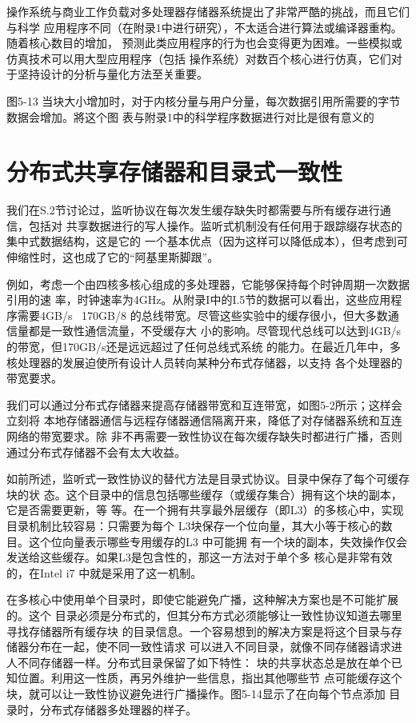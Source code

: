 操作系统与商业工作负载对多处理器存储器系统提出了非常严酷的挑战，而且它们与科学
应用程序不同（在附录1中进行研究），不太适合进行算法或编译器重构。随着核心数目的增加，
预测此类应用程序的行为也会变得更为困难。一些模拟或仿真技术可以用大型应用程序（包括
操作系统）对数百个核心进行仿真，它们对于坚持设计的分析与量化方法至关重要。

图5-13 当块大小增加时，对于内核分量与用户分量，每次数据引用所需要的字节数据会增加。將这个图
表与附录1中的科学程序数据进行对比是很有意义的

\section{分布式共享存储器和目录式一致性}
我们在S.2节讨论过，监听协议在每次发生缓存缺失时都需要与所有缓存进行通信，包括对
共享数据进行的写人操作。监听式机制没有任何用于跟踪缀存状态的集中式数据结构，这是它的
一个基本优点（因为这样可以降低成本），但考虑到可伸缩性时，这也成了它的“阿基里斯脚跟”。

例如，考虑一个由四核多核心组成的多处理器，它能够保持每个时钟周期一次数据引用的速
率，时钟速率为4GHz。从附录I中的I.5节的数据可以看出，这些应用程序需要4GB/s ~170GB/8
的总线带宽。尽管这些实验中的缓存很小，但大多数通信量都是一致性通信流量，不受缓存大
小的影响。尽管现代总线可以达到4GB/s的带宽，但170GB/s还是远远超过了任何总线式系统
的能力。在最近几年中，多核处理器的发展迫使所有设计人员转向某种分布式存储器，以支持
各个处理器的带宽要求。

我们可以通过分布式存储器来提高存储器带宽和互连带宽，如图5-2所示；这样会立刻将
本地存储器通信与远程存储器通信隔离开来，降低了对存储器系统和互连网络的带宽要求。除
非不再需要一致性协议在每次缓存缺失时都进行广播，否则通过分布式存储器不会有太大收益。

如前所述，监听式一致性协议的替代方法是目录式协议。目录中保存了每个可缓存块的状
态。这个目录中的信息包括哪些缓存（或缓存集合）拥有这个块的副本，它是否需要更新，等
等。在一个拥有共享最外层缓存（即L3）的多核心中，实现目录机制比较容易：只需要为每个
L3块保存一个位向量，其大小等于核心的数目。这个位向量表示哪些专用缓存的L3 中可能拥
有一个块的副本，失效操作仅会发送给这些缓存。如果L3是包含性的，那这一方法对于单个多
核心是非常有效的，在Intel i7 中就是采用了这一机制。

在多核心中使用单个目录时，即使它能避免广播，这种解决方案也是不可能扩展的。这个
目录必须是分布式的，但其分布方式必须能够让一致性协议知道去哪里寻找存储器所有缓存块
的目录信息。一个容易想到的解决方案是将这个目录与存储器分布在一起，使不同一致性请求
可以进入不同目录，就像不同存储器请求进人不同存储器一样。分布式目录保留了如下特性：
块的共享状态总是放在单个已知位置。利用这一性质，再另外维护一些信息，指出其他哪些节
点可能缓存这个块，就可以让一致性协议避免进行广播操作。图5-14显示了在向每个节点添加
目录时，分布式存储器多处理器的样子。


